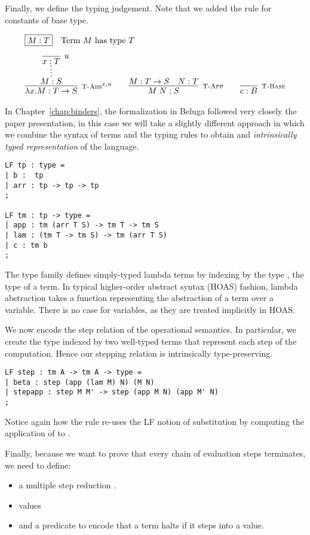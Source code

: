 Finally, we define the typing judgement. Note that we added the rule
\TBase for constants of base type.

\[
\begin{array}{c}
\multicolumn{1}{l}{\mbox{\fbox{$M:T$}~~ \mbox{Term $M$ has type $T$}}} \\[1em]
\infer[\TFn^{x,u}]{\lam x.M : T \arrow S}
                 {\infer*{M:S}{\infer[u]{x:T}{}}} \qquad
\infer[\TApp]{M\;N : S}{M : T \arrow S & N:T} \qquad
\infer[\TBase]{c : B}{}
\end{array}
\]

In Chapter~\ref{chap:binders}, the formalization in Beluga followed
very closely the paper presentation, in this case we will take a
slightly different approach in which we combine the syntax of terms
and the typing rules to obtain and \emph{intrinsically typed
  representation} of the language.

\begin{lstlisting}
LF tp : type =
| b :  tp
| arr : tp -> tp -> tp
;

LF tm : tp -> type =
| app : tm (arr T S) -> tm T -> tm S
| lam : (tm T -> tm S) -> tm (arr T S)
| c : tm b
;
\end{lstlisting}

The type family  defines simply-typed lambda terms by 
indexing  by the type , the type of a term. In typical higher-order
abstract syntax (HOAS) fashion, lambda abstraction takes a function
representing the abstraction of a term over a variable. There is no
case for variables, as they are treated implicitly in HOAS.

We now encode the step relation of the operational semantics. In
particular, we create the  type indexed by two well-typed terms that
represent each step of the computation. Hence our stepping relation is
intrinsically type-preserving. 

\begin{lstlisting}
LF step : tm A -> tm A -> type =
| beta : step (app (lam M) N) (M N)
| stepapp : step M M' -> step (app M N) (app M' N)
;
\end{lstlisting}

Notice again how the  rule re-uses the LF notion of substitution by
computing the application of  to .

Finally, because we want to prove that every chain of evaluation steps
terminates, we need to define:
\begin{itemize}
\item a multiple step reduction .
\item values 
\item and a predicate  to encode that a term halts if it steps into a value.
\end{itemize}

